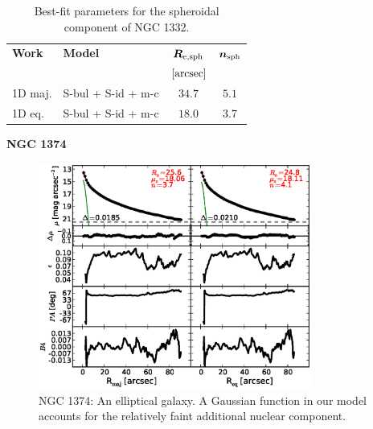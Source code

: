 \documentclass[preprint2]{emulateapj}
\newcommand{\fitfigurewidth}{0.8\textwidth}
\begin{document}
  \begin{table}[h]
  \small
  \caption{Best-fit parameters for the spheroidal component of NGC 1332.}
  \begin{center}
  \begin{tabular}{llcc}
  \hline
  {\bf Work} & {\bf Model}   & $\bm R_{\rm e,sph}$    & $\bm n_{\rm sph}$ \\
    &  &  $[\rm arcsec]$ & \\
  \hline
  1D maj. & S-bul + S-id + m-c & $34.7$  &  $5.1$ \\
  1D eq.  & S-bul + S-id + m-c & $18.0$  &  $3.7$ \\
  \hline
  \end{tabular}
  \end{center}
  \label{tab:n1332}
  \end{table}

  \clearpage\newpage\noindent
  {\bf NGC 1374 \\}

  \begin{figure}[h]
  \begin{center}
  \includegraphics[width=\fitfigurewidth]{n1374_1Dfit.eps}
  \caption{NGC 1374: 
  An elliptical galaxy. 
  A Gaussian function in our model accounts for the relatively faint additional nuclear component. 
  }
  \end{center}
  \end{figure}
\end{document}
